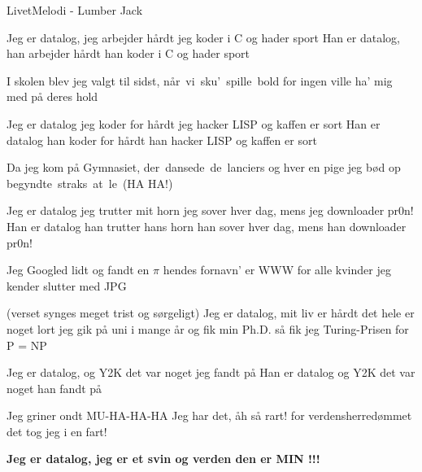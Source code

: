 \begin{sang}{Livet}{Melodi - Lumber Jack}
\begin{vers}
Jeg er datalog, jeg arbejder hårdt
jeg koder i C og hader sport
Han er datalog, han arbejder hårdt
han koder i C og hader sport
\end{vers}
\begin{vers}
I skolen blev jeg valgt til sidst, når~vi~sku'~spille~bold
for ingen ville ha' mig med på deres hold
\end{vers}
\begin{vers}
Jeg er datalog jeg koder for hårdt
jeg hacker LISP og kaffen er sort
Han er datalog han koder for hårdt
han hacker LISP og kaffen er sort
\end{vers}
\begin{vers}
Da jeg kom på Gymnasiet, der~dansede~de~lanciers
og hver en pige jeg bød op begyndte~straks~at~le~(HA HA!)
\end{vers}
\begin{vers}
Jeg er datalog jeg trutter mit horn
jeg sover hver dag, 
mens jeg downloader pr0n!
Han er datalog han trutter hans horn
han sover hver dag, 
mens han downloader pr0n!
\end{vers}
\begin{vers}
Jeg Googled lidt og fandt en $\pi$ hendes fornavn' er WWW
for alle kvinder jeg kender slutter med JPG
\end{vers}
\begin{vers}
(verset synges meget trist og sørgeligt)
Jeg er datalog, mit liv er hårdt
det hele er noget lort
jeg gik på uni i mange år
og fik min Ph.D.
så fik jeg Turing-Prisen
for P = NP
\end{vers}
\begin{vers}
Jeg er datalog, og Y2K
det var noget jeg fandt på
Han er datalog og Y2K
det var noget han fandt på
\end{vers}
\begin{vers}
Jeg griner ondt
MU-HA-HA-HA
Jeg har det, åh så rart!
for verdensherredømmet
det tog jeg i en fart!
\end{vers}
\begin{vers}
{\bf Jeg er datalog, jeg er et svin
og verden den er MIN !!! }
\end{vers}
\laps
\end{sang}
